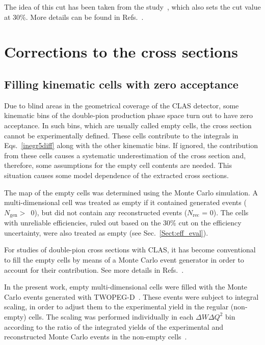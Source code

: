 \documentclass[prc,twocolumn,superscriptaddress,showpacs,amssymb,amsmath,amsfonts,aps,nofootinbib]{revtex4-1}
\begin{document}
The idea of this cut has been taken from the study~\cite{Fed_an_note:2017,Fed_paper_2018}, which also sets the cut value at 30\%. More details can be found in Refs.\!~\cite{my_an_note:2020, my_thesis:2021,Fed_an_note:2017,Fed_paper_2018}.






\section{Corrections to the cross sections}

\subsection{Filling kinematic cells with zero acceptance}
\label{Sect:empt_cells}


Due to blind areas in the geometrical coverage of the CLAS detector, some kinematic bins of the double-pion production phase space turn out to have zero acceptance. In such bins, which are usually called empty cells, the cross section cannot be experimentally defined. These cells contribute to the integrals in Eqs.\!~\eqref{inegr5diff} along with the other kinematic bins. If ignored, the contribution from these cells causes a systematic underestimation of the cross section and, therefore, some assumptions for the empty cell contents are needed. This situation causes some model dependence of the extracted cross sections. 


The map of the empty cells was determined using the Monte Carlo simulation. A multi-dimensional cell was treated as empty if it contained generated events ($N_{\text{gen}} >$~0), but did not contain any reconstructed events ($N_{\text{rec}}$ = 0). The cells with unreliable efficiencies, ruled out based on the 30\% cut on the efficiency uncertainty, were also treated as empty (see Sec.\!~\ref{Sect:eff_eval}).


For studies of double-pion cross sections with CLAS, it has become conventional to fill the empty cells by means of a Monte Carlo event generator in order to account for their contribution. See more details in Refs.\!~\cite{Rip_an_note:2002,Ripani:2002ss,Fed_an_note:2007,Fedotov:2008aa,Isupov:2017lnd,Arjun,Fed_an_note:2017,Fed_paper_2018}.


In the present work, empty multi-dimensional cells were filled with the Monte Carlo events generated with TWOPEG-D~\cite{twopeg-d}. These events were subject to integral scaling, in order to adjust them to the experimental yield in the regular (non-empty) cells. The scaling was performed individually in each $\Delta W\Delta Q^2$ bin according to the ratio of the integrated yields of the experimental and reconstructed Monte Carlo events in the non-empty cells~\cite{my_an_note:2020, my_thesis:2021}. 
\end{document}
